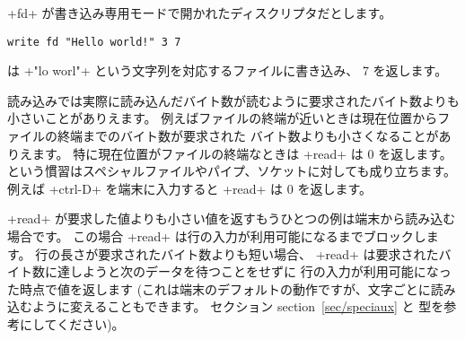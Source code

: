 
\begin{example}
\ml+fd+ が書き込み専用モードで開かれたディスクリプタだとします。
%
\begin{lstlisting}
write fd "Hello world!" 3 7
\end{lstlisting}
%
は \ml+"lo worl"+ という文字列を対応するファイルに書き込み、 7 を返します。
\end{example}

読み込みでは実際に読み込んだバイト数が読むように要求されたバイト数よりも小さいことがありえます。
例えばファイルの終端が近いときは現在位置からファイルの終端までのバイト数が要求された
バイト数よりも小さくなることがありえます。
特に現在位置がファイルの終端なときは \ml+read+ は 0 を返します。
 という慣習はスペシャルファイルやパイプ、ソケットに対しても成り立ちます。
例えば \ml+ctrl-D+ を端末に入力すると \ml+read+ は 0 を返します。

\ml+read+ が要求した値よりも小さい値を返すもうひとつの例は端末から読み込む場合です。
この場合 \ml+read+ は行の入力が利用可能になるまでブロックします。
行の長さが要求されたバイト数よりも短い場合、
\ml+read+ は要求されたバイト数に達しようと次のデータを待つことをせずに
行の入力が利用可能になった時点で値を返します
(これは端末のデフォルトの動作ですが、文字ごとに読み込むように変えることもできます。
 セクション section~\ref{sec/speciaux} と  型を参考にしてください)。

